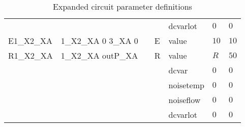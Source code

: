 \begin{table}[H]
\begin{tabular}[c]{lllllll}
\rowcolor{myyellow}
 & & & &\small{dcvarlot} &$0$ &$0$ \\ 
\small{E1\_X2\_XA} &\small{1\_X2\_XA 0 3\_XA 0 } & &\small{E} &\small{value} &$10$ &$10$ \\ 
\rowcolor{myyellow}
\small{R1\_X2\_XA} &\small{1\_X2\_XA outP\_XA } & &\small{R} &\small{value} &$R$ &$50$ \\ 
 & & & &\small{dcvar} &$0$ &$0$ \\ 
\rowcolor{myyellow}
 & & & &\small{noisetemp} &$0$ &$0$ \\ 
 & & & &\small{noiseflow} &$0$ &$0$ \\ 
\rowcolor{myyellow}
 & & & &\small{dcvarlot} &$0$ &$0$ \\ 
\end{tabular}
\caption{Expanded circuit parameter definitions}
\end{table}

